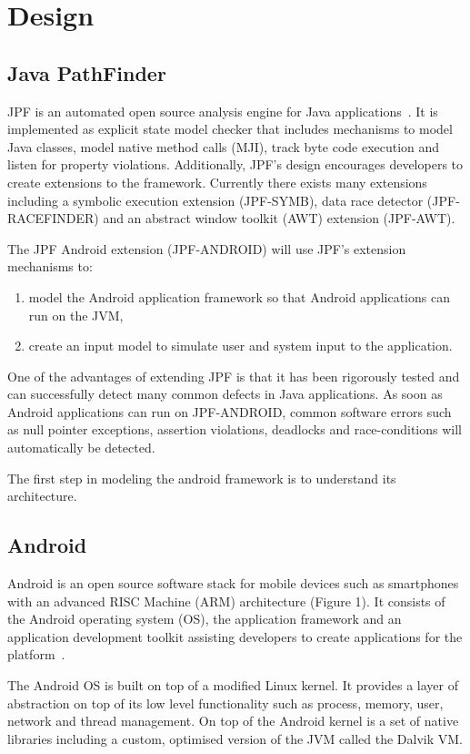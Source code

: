 \documentclass{acm_proc_article-sp}
\begin{document}
\section{Design}
\subsection{Java PathFinder}
JPF is an automated open source analysis engine for Java applications~\cite{JPFDocs}. It is implemented as explicit state model checker
that includes mechanisms to model Java classes, model native method calls (MJI), track byte code execution and listen for
property violations. Additionally, JPF's design encourages developers to create extensions to the framework. Currently there exists many
extensions including a symbolic execution extension (JPF-SYMB), data race
detector (JPF-RACEFINDER) and an abstract window toolkit (AWT) extension (JPF-AWT).

The JPF Android extension (JPF-ANDROID) will use JPF's extension mechanisms to:
\begin{enumerate}
\item model the Android application framework so that Android applications can run on the JVM,
\item create an input model to simulate user and system input to the application.
\end{enumerate}

One of the advantages of extending JPF is that it has been rigorously tested and can successfully detect many common defects in Java applications. As soon as
Android applications can run on JPF-ANDROID, common software errors such as null pointer exceptions, assertion violations, deadlocks and
race-conditions will automatically be detected.

The first step in modeling the android framework is to understand its architecture.

\subsection{Android}
Android is an open source software stack for mobile devices such as smartphones with an advanced RISC Machine (ARM) architecture (Figure 1).
It consists of the Android operating system (OS), the application framework and an application development toolkit assisting developers to create
applications for the platform~\cite{AndroidDocs}.

The Android OS is built on top of a modified Linux kernel. It provides a layer of abstraction on top of its low level functionality such as process,
memory, user, network and thread management. On top of the Android kernel is a set of native libraries including a custom, optimised version of the
JVM called the Dalvik VM.
\end{document}

